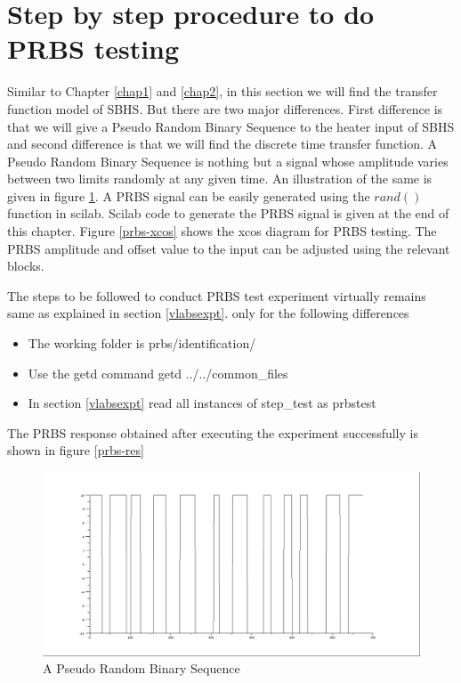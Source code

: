 \section{Step by step procedure to do PRBS testing}

Similar to Chapter \ref{chap1} and \ref{chap2}, in this section we will find the transfer function model of SBHS. But there are two major differences. First difference is that we will give a Pseudo Random Binary Sequence to the heater input of SBHS and second difference is that we will find the discrete time transfer function. A Pseudo Random Binary Sequence is nothing but a signal whose amplitude varies between two limits randomly at any given time. An illustration of the same is given in figure \ref{prbs-fig}. A PRBS signal can be easily generated using the $rand()$ function in scilab. Scilab code to generate the PRBS signal is given at the end of this chapter. Figure \ref{prbs-xcos} shows the xcos diagram for PRBS testing. The PRBS amplitude and offset value to the input can be adjusted using the relevant blocks. 

The steps to be followed to conduct PRBS test experiment virtually remains same as explained in section \ref{vlabsexpt}. only for the following differences
\begin{itemize}
\item The working folder is prbs/identification/
\item Use the getd command getd ../../common\_files
\item In section \ref{vlabsexpt} read all instances of step\_test as prbstest
\end{itemize}
The PRBS response obtained after executing the experiment successfully is shown in figure \ref{prbs-res}
\begin{figure}
\centering
\includegraphics[width=0.7\linewidth]{prbs/prbs-illustration.png}
\caption{A Pseudo Random Binary Sequence}
\label{prbs-fig}
\end{figure}

